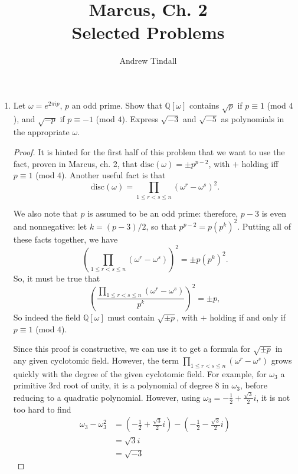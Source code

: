 \documentclass[12pt]{article}
\newcommand{\Q}{\mathbb{Q}}
\theoremstyle{definition}
\newenvironment{problem}[2][Problem]{\begin{trivlist}
\item[\hskip \labelsep {\bfseries #1}\hskip \labelsep {\bfseries #2.}]}{\end{trivlist}}
\begin{document}
 
 
\title{Marcus, Ch. 2\\
Selected Problems}
\author{Andrew Tindall}
 
\maketitle
\begin{problem}{8}
	\begin{enumerate}[label= (\alph*)]
		\item 
	Let $\omega = e^{2\pi i p}$, $p$ an odd prime. Show that $\Q[\omega]$ contains $\sqrt{p}$ if $p \equiv 1$ (mod $4$), and $\sqrt{-p}$ if $p \equiv -1$ (mod $4$). Express $\sqrt{-3}$ and $\sqrt{-5}$ as polynomials in the appropriate $\omega$.
	\begin{proof}
		It is hinted for the first half of this problem that we want to use the fact, proven in Marcus, ch. 2, that $\text{disc}(\omega) = \pm p^{p-2}$, with $+$ holding iff $p \equiv 1$ (mod $4$). Another useful fact is that 
		\[ \text{disc}(\omega) = \prod_{1 \leq r < s \leq n} (\omega^r - \omega^s)^2.\]
		\par We also note that $p$ is assumed to be an odd prime: therefore, $p - 3$ is even and nonnegative: let $k = (p - 3)  / 2$, so that $p^{p - 2} = p (p^k)^2$. Putting all of these facts together, we have
		\[\left( \prod_{1 \leq r < s \leq n} (\omega^r - \omega^s)\right )^2 = \pm p (p^k)^2.\]
		So, it must be true that
		\[\left( \frac{\prod_{ 1 \leq r < s \leq n} (\omega^r - \omega^s)}{p^k} \right)^2 = \pm p,\]
		So indeed the field $\Q[\omega]$ must contain $\sqrt{ \pm p}$, with $+$ holding if and only if $p \equiv 1$ (mod $4$).
		\par Since this proof is constructive, we can use it to get a formula for $\sqrt{\pm p}$ in any given cyclotomic field. However, the term $\prod_{1 \leq r < s \leq n} (\omega^r - \omega^s)$ grows quickly with the degree of the given cyclotomic field. For example, for $\omega_3$ a primitive $3$rd root of unity, it is a polynomial of degree $8$ in $\omega_3$, before reducing to a quadratic polynomial. However, using $\omega_3 = -\frac{1}{2} + \frac{\sqrt{3}}{2} i$, it is not too hard to find
		\begin{align*}\omega_3 - \omega_3^2 &= \left( -\frac{1}{2} + \frac{\sqrt{3}}{2}i \right) - \left( -\frac{1}{2} - \frac{\sqrt{3}}{2} i \right)\\
			&= \sqrt{3} i\\
			&= \sqrt{-3}

\end{align*}
\end{proof}
\end{enumerate}
\end{problem}
\end{document}
